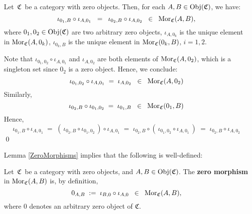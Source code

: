 \vskip 0.5cm
\begin{lemma}\label{ZeroMorphisms}
\mbox{}
\vskip 0.15cm
\noindent
Let \,$\mathfrak{C}$\, be a category with zero objects.
Then, for each $A, B \in \textnormal{Obj}(\mathfrak{C})$, we have:
\begin{equation*}
\iota_{0_{1},B}\circ\iota_{A,0_{1}}
\;\; = \;\;
	\iota_{0_{2},B}\circ\iota_{A,0_{2}}
\;\; \in \;\;
	\textnormal{Mor}_{\mathfrak{C}}(A,B),
\end{equation*}
where
$0_{1}, 0_{2} \in \textnormal{Obj}(\mathfrak{C})$ are two arbitrary zero objects,
$\iota_{A,0_{k}}$ is the unique element in $\textnormal{Mor}_{\mathfrak{C}}(A,0_{k})$,
$\iota_{0_{k},B}$ is the unique element in $\textnormal{Mor}_{\mathfrak{C}}(0_{k},B)$,
$i = 1,2$.
\end{lemma}
\proof
Note that $\iota_{0_{1},0_{2}}\circ\iota_{A,0_{1}}$ and $\iota_{A,0_{2}}$ are both elements of $\textnormal{Mor}_{\mathfrak{C}}(A,0_{2})$,
which is a singleton set since $0_{2}$ is a zero object. Hence, we conclude:
\begin{equation*}
\iota_{0_{1},0_{2}}\circ\iota_{A,0_{1}} \; = \; \iota_{A,0_{2}} \;\; \in \;\; \textnormal{Mor}_{\mathfrak{C}}(A,0_{2})
\end{equation*}
Similarly,
\begin{equation*}
\iota_{0_{2},B}\circ\iota_{0_{1},0_{2}} \; = \; \iota_{0_{1},B} \;\; \in \;\; \textnormal{Mor}_{\mathfrak{C}}(0_{1},B)
\end{equation*}
Hence,
\begin{equation*}
\iota_{0_{1},B} \circ \iota_{A,0_{1}}
\; = \;
	(\,\iota_{0_{2},B}\circ\iota_{0_{1},0_{2}}\,) \circ \iota_{A,0_{1}}
\; = \;
	\iota_{0_{2},B} \circ (\,\iota_{0_{1},0_{2}} \circ \iota_{A,0_{1}}\,)
\; = \;
	\iota_{0_{2},B} \circ \iota_{A,0_{2}}
\end{equation*}
\qed

\vskip 0.5cm
\noindent
Lemma \ref{ZeroMorphisms} implies that the following is well-defined:


\vskip 0.5cm
\begin{definition}
\mbox{}
\vskip 0.15cm
\noindent
Let \,$\mathfrak{C}$\, be a category with zero objects, and $A, B \in \textnormal{Obj}(\mathfrak{C})$.
The \textbf{zero morphism} in $\textnormal{Mor}_{\mathfrak{C}}(A,B)$ is, by definition,
\begin{equation*}
0_{A,B}
\; := \;
	\iota_{B,0} \circ \iota_{A,0}
\;\; \in \;\;
	\textnormal{Mor}_{\mathfrak{C}}(A,B),
\end{equation*}
where $0$ denotes an arbitrary zero object of $\mathfrak{C}$.
\end{definition}

